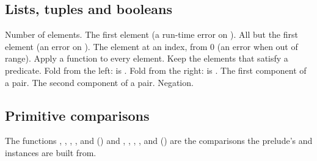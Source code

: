 \subsection{Lists, tuples and booleans}
\begin{siglist}
 Number of elements.
 The first element (a run-time error on \tc{[]}).
 All but the first element (an error on \tc{[]}).
 The element at an index, from 0 (an
error when out of range).
 Apply a function to every element.
 Keep the elements that satisfy a predicate.
 Fold from the left:
 is .
 Fold from the right:
 is .
 The first component of a pair.
 The second component of a pair.
 Negation.
\end{siglist}

\subsection{Primitive comparisons}
The functions , , , ,
 and  () and ,
, , , 
and  () are the comparisons the
prelude's  and  instances are built from.
